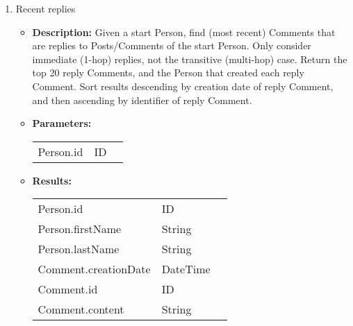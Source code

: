 {\begin{enumerate}
    \item Recent replies
        \begin{itemize}
            \item \textbf{Description:}
                Given a start Person, find (most recent) Comments that are replies
                to Posts/Comments of the start Person. Only consider immediate
                (1-hop) replies, not the transitive (multi-hop) case.  Return the
                top 20 reply Comments, and the Person that created each reply
                Comment.  Sort results descending by creation date of reply
                Comment, and then ascending by identifier of reply Comment.
            \item \textbf{Parameters:} \\
                \begin{tabular}{lll}
                    Person.id 	 						& ID & \parbox[t]{20cm}{\par \strut} \\
                \end{tabular}		
            \item \textbf{Results:} \\
                \begin{tabular}{lll}
                    Person.id 	 				& ID & \parbox[t]{20cm}{\par \strut} \\
                    Person.firstName 	 		& String & \parbox[t]{20cm}{\par \strut} \\
                    Person.lastName 	 		& String & \parbox[t]{20cm}{\par \strut} \\
                    Comment.creationDate 	 	& DateTime & \parbox[t]{20cm}{\par \strut} \\
                    Comment.id 	 				& ID & \parbox[t]{20cm}{\par \strut} \\
                    Comment.content 	 		& String & \parbox[t]{20cm}{\par \strut} \\
                \end{tabular}		
        \end{itemize}


\end{enumerate}}
